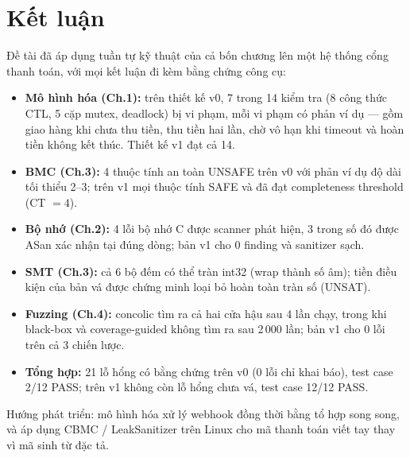 \chapter{Kết luận}
\label{ch:ketluan}

Đề tài đã áp dụng tuần tự kỹ thuật của cả bốn chương lên một hệ thống cổng thanh toán, với mọi
kết luận đi kèm bằng chứng công cụ:
\begin{itemize}
  \item \textbf{Mô hình hóa (Ch.1):} trên thiết kế v0, 7 trong 14 kiểm tra (8 công thức CTL,
        5 cặp mutex, deadlock) bị vi phạm, mỗi vi phạm có phản ví dụ — gồm giao hàng khi chưa thu
        tiền, thu tiền hai lần, chờ vô hạn khi timeout và hoàn tiền không kết thúc. Thiết kế v1
        đạt cả 14.
  \item \textbf{BMC (Ch.3):} 4 thuộc tính an toàn UNSAFE trên v0 với phản ví dụ độ dài tối thiểu
        2--3; trên v1 mọi thuộc tính SAFE và đã đạt completeness threshold (CT $=4$).
  \item \textbf{Bộ nhớ (Ch.2):} 4 lỗi bộ nhớ C được scanner phát hiện, 3 trong số đó được ASan xác
        nhận tại đúng dòng; bản v1 cho 0 finding và sanitizer sạch.
  \item \textbf{SMT (Ch.3):} cả 6 bộ đếm có thể tràn int32 (wrap thành số âm); tiền điều kiện của
        bản vá được chứng minh loại bỏ hoàn toàn tràn số (UNSAT).
  \item \textbf{Fuzzing (Ch.4):} concolic tìm ra cả hai cửa hậu sau 4 lần chạy, trong khi
        black-box và coverage-guided không tìm ra sau 2\,000 lần; bản v1 cho 0 lỗi trên cả 3
        chiến lược.
  \item \textbf{Tổng hợp:} 21 lỗ hổng có bằng chứng trên v0 (0 lỗi chỉ khai báo), test case
        2/12 PASS; trên v1 không còn lỗ hổng chưa vá, test case 12/12 PASS.
\end{itemize}
Hướng phát triển: mô hình hóa xử lý webhook đồng thời bằng tổ hợp song song, và áp dụng CBMC /
LeakSanitizer trên Linux cho mã thanh toán viết tay thay vì mã sinh từ đặc tả.

